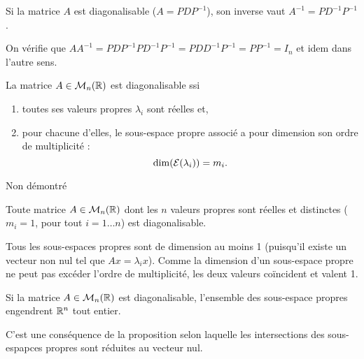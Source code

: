 

\begin{proposition*}
  Si la matrice $A$ est diagonalisable ($A = P D P^{-1}$), son inverse vaut $A^{-1} = P D^{-1} P^{-1}$.
\end{proposition*}

\proof
On vérifie que $A A^{-1} = P D P^{-1} P D^{-1} P^{-1} = P D D^{-1} P^{-1} = P P^{-1} = I_n$ et idem dans l'autre sens.
\eproof

\begin{theorem*}
  La matrice $A \in \mathcal{M}_n(\mathbb{R})$ est diagonalisable ssi 
  \begin{enumerate}
   \item toutes ses valeurs propres $\lambda_i$ sont réelles et, 
   \item pour chacune d'elles, le sous-espace propre associé a pour dimension son ordre de multiplicité : 
   $$
   \dim(\mathcal{E}(\lambda_i)) = m_i.
   $$
  \end{enumerate}
\end{theorem*}

\proof
Non démontré
\eproof

\begin{corollary*}
  Toute matrice $A \in \mathcal{M}_n(\mathbb{R})$ dont les $n$ valeurs propres sont réelles et distinctes ($m_i = 1$, pour tout $i = 1 \dots n$) est diagonalisable.
\end{corollary*}

\proof
Tous les sous-espaces propres sont de dimension au moins 1 (puisqu'il existe un vecteur non nul tel que $Ax = \lambda_i x$). Comme la dimension d'un sous-espace propre ne peut pas excéder l'ordre de multiplicité, les deux valeurs coïncident et valent 1.
\eproof

\begin{corollary*}
  Si la matrice $A \in \mathcal{M}_n(\mathbb{R})$ est diagonalisable, l'ensemble des sous-espace propres engendrent $\mathbb{R}^n$ tout entier.
\end{corollary*}

\proof
C'est une conséquence de la proposition selon laquelle les intersections des sous-espapces propres sont réduites au vecteur nul.
\eproof

